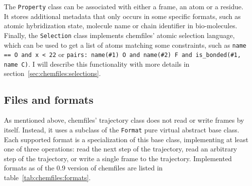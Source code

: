 \documentclass[thesis]{subfiles}
\begin{document}
The \texttt{Property} class can be associated with either a frame, an atom or a
residue. It stores additional metadata that only occurs in some specific
formats, such as atomic hybridization state, molecule name or chain identifier
in bio-molecules. Finally, the \texttt{Selection} class implements chemfiles'
atomic selection language, which can be used to get a list of atoms matching
some constraints, such as \texttt{name == O and x < 22} or \texttt{pairs:
name(\#1) O and name(\#2) F and is\_bonded(\#1, name C)}. I will describe this
functionality with more details in section~\ref{sec:chemfiles:selections}.

\subsection{Files and formats}
\label{sec:chemfiles:formats}

As mentioned above, chemfiles' trajectory class does not read or write frames by
itself. Instead, it uses a subclass of the \texttt{Format} pure virtual
abstract base class. Each supported format is a specialization of this base
class, implementing at least one of three operations: read the next step of the
trajectory, read an arbitrary step of the trajectory, or write a single frame to
the trajectory. Implemented formats as of the 0.9 version of chemfiles are
listed in table~\ref{tab:chemfiles:formats}.
\end{document}
